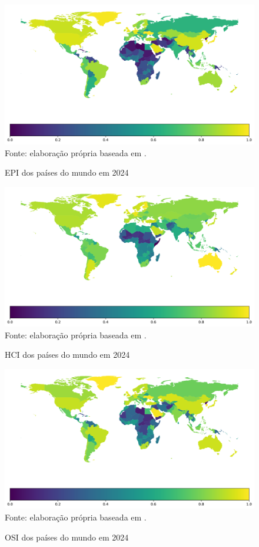 \begin{figure}[H]
	\centering
	\caption{EPI dos países do mundo em 2024}
	\includegraphics[width=1\linewidth]{figuras/mapa_coropletico_paises_epi}
	\label{fig:mapa_coropletico_paises_epi}
	\footnotesize{Fonte: elaboração própria baseada em \cite{ONU_EGDI_dados}.}
\end{figure}

\begin{figure}[H]
	\centering
	\caption{HCI dos países do mundo em 2024}
	\includegraphics[width=1\linewidth]{figuras/mapa_coropletico_paises_hci}
	\label{fig:mapa_coropletico_paises_hci}
	\footnotesize{Fonte: elaboração própria baseada em \cite{ONU_EGDI_dados}.}
\end{figure}

\begin{figure}[H]
	\centering
	\caption{OSI dos países do mundo em 2024}
	\includegraphics[width=1\linewidth]{figuras/mapa_coropletico_paises_osi}
	\label{fig:mapa_coropletico_paises_osi}
	\footnotesize{Fonte: elaboração própria baseada em \cite{ONU_EGDI_dados}.}
\end{figure}

